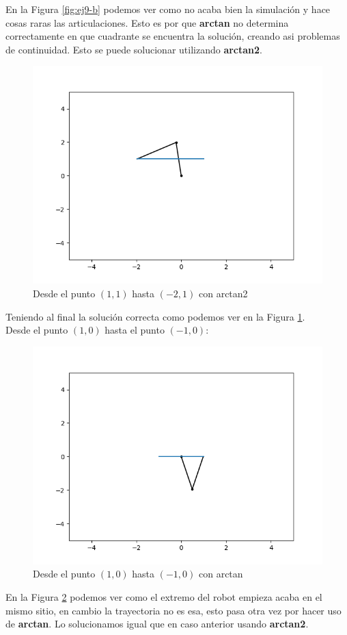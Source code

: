 \documentclass[12pt,a4paper]{report}
\begin{document}
En la Figura \ref{fig:ej9-b} podemos ver como no acaba bien la simulación y hace cosas raras las articulaciones.  Esto es por que \textbf{arctan} no determina correctamente en que cuadrante se encuentra la solución, creando asi problemas de continuidad. Esto se puede solucionar utilizando \textbf{arctan2}. 
\begin{figure}[H]
	\centering
	\includegraphics[width=0.7\linewidth]{img/Segundo__apartado-Eje_9-b.png}
	\caption{Desde el punto $(1,1)$ hasta $(-2,1)$  con arctan2}
	\label{fig:ej9-b-b}
\end{figure}
Teniendo al final la solución correcta como podemos ver en la Figura \ref{fig:ej9-b-b}.
\\
Desde el punto $(1,0)$ hasta el punto $(-1,0)$:
\begin{figure}[H]
	\centering
	\includegraphics[width=0.7\linewidth]{img/Tercer_apartado-Eje_9.png}
	\caption{Desde el punto $(1,0)$ hasta $(-1,0)$ con arctan}
	\label{fig:ej9-c}
\end{figure}
En la Figura \ref{fig:ej9-c} podemos ver como el extremo del robot empieza acaba en el mismo sitio, en cambio la trayectoria no es esa, esto pasa otra vez por hacer uso de \textbf{arctan}. Lo solucionamos igual que en caso anterior usando \textbf{arctan2}.
\end{document}
